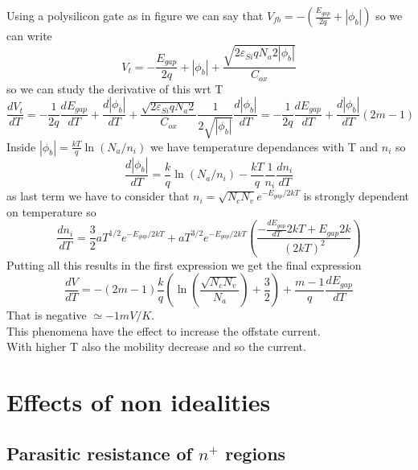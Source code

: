 Using a polysilicon gate as in figure we can say that $V_{fb}=-(\frac{E_{gap}}{2q}+|\phi_b|)$ so we can write 
\begin{equation}
V_t=-\frac{E_{gap}}{2q}+|\phi_b|+\frac{\sqrt{2\varepsilon_{Si}qN_a2|\phi_b|}}{C_{ox}}
\end{equation}
so we can study the derivative of this wrt T
\begin{equation}
\frac{dV_t}{dT}=-\frac{1}{2q}\frac{dE_{gap}}{dT}+\frac{d|\phi_b|}{dT}+\frac{\sqrt{2\varepsilon_{Si}qN_a2}}{C_{ox}}\frac{1}{2\sqrt{|\phi_b|}}\frac{d|\phi_b|}{dT}=-\frac{1}{2q}\frac{dE_{gap}}{dT}+\frac{d|\phi_b|}{dT}(2m-1)
\end{equation}
Inside $|\phi_b|=\frac{kT}{q}\ln(N_a/n_i)$ we have temperature dependances with T and $n_i$ so 
\begin{equation}
\frac{d|\phi_b|}{dT}=\frac{k}{q}\ln(N_a/n_i)-\frac{kT}{q}\frac{1}{n_i}\frac{dn_i}{dT}
\end{equation}
as last term we have to consider that $n_i=\sqrt{N_cN_v}e^{-E_{gap}/2kT}$ is strongly dependent on temperature so 
\begin{equation}
\frac{dn_i}{dT}=\frac{3}{2}aT^{1/2}e^{-E_{gap}/2kT}+aT^{3/2}e^{-E_{gap}/2kT}\left(\frac{-\frac{dE_{gap}}{dT}2kT+E_{gap}2k}{(2kT)^2}\right)
\end{equation}
Putting all this results in the first expression we get the final expression
\begin{equation}
\frac{dV}{dT}=-(2m-1)\frac{k}{q}\left(\ln(\frac{\sqrt{N_cN_v}}{N_a})+\frac{3}{2}\right) +\frac{m-1}{q}\frac{dE_{gap}}{dT}
\end{equation}
That is negative $\simeq -1mV/K$.\\
This phenomena have the effect to increase the offstate current.\\
With higher T also the mobility decrease and so the current.\\


\section{Effects of non idealities}

\subsection{Parasitic resistance of $n^+$ regions}


